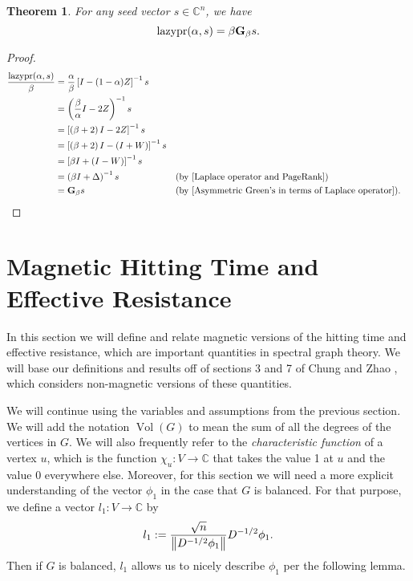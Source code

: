 \documentclass{article}
\newtheorem{thm}{Theorem}
\theoremstyle{definition}
\newcommand{\C}{\mathbb C}
\DeclarePairedDelimiter\norm{\lVert}{\rVert}
\DeclareMathOperator{\lazypr}{lazypr}
\DeclareMathOperator{\vol}{Vol}
\newcommand{\laplace}{\Delta}
\newcommand{\asymgreen}{\normalfont{\textbf{G}}}
\begin{document}
\begin{thm}
For any seed vector $s \in \C^n$, we have
$$
\lazypr (\alpha, s) = \beta \asymgreen_\beta s.
$$
\end{thm}
\begin{proof}
\begin{align*}
\frac{\lazypr (\alpha, s)}{\beta} 
&= \frac{\alpha}{\beta} \left[ I - (1 - \alpha)Z \right]^{-1} s \\ 
&= \left( \frac{\beta}{\alpha} I - 2 Z \right)^{-1} s \\
&= \left[ \left( \beta + 2 \right) I - 2 Z \right]^{-1} s \\
&= \left[ \left( \beta + 2 \right) I - (I + W) \right]^{-1} s \\
&= \left[ \beta I + (I - W) \right]^{-1} s \\
&= \left( \beta I + \laplace \right)^{-1} s &&\text{(by \cref{Laplace operator and PageRank})} \\
&= \asymgreen_\beta s &&\text{(by \cref{Asymmetric Green's in terms of Laplace operator})}.
\end{align*}
\end{proof}

\section{Magnetic Hitting Time and Effective Resistance}

In this section we will define and relate magnetic versions of the hitting time and effective resistance, which are important quantities in spectral graph theory. We will base our definitions and results off of sections 3 and 7 of Chung and Zhao \cite{pagerankrandomwalks}, which considers non-magnetic versions of these quantities.

We will continue using the variables and assumptions from the previous section. We will add the notation $\vol (G)$ to mean the sum of all the degrees of the vertices in $G$. We will also frequently refer to the \textit{characteristic function} of a vertex $u$, which is the function $\chi_u: V \rightarrow \C$ that takes the value 1 at $u$ and the value 0 everywhere else. Moreover, for this section we will need a more explicit understanding of the vector $\phi_1$ in the case that $G$ is balanced. For that purpose, we define a vector $l_1 : V \rightarrow \C$ by 
$$
l_1 := \frac{\sqrt{n}}{\norm*{D^{-1/2} \phi_1}} D^{-1/2} \phi_1. 
$$
Then if $G$ is balanced, $l_1$ allows us to nicely describe $\phi_1$ per the following lemma.
\end{document}

